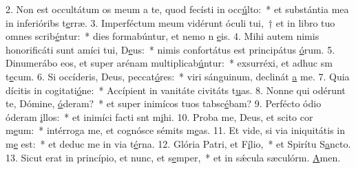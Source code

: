 2. Non est occultátum os meum a te, quod fecísti in occ\uline{ú}lto:~* et substántia mea in inferióribs t\uline{e}rræ.
3. Imperféctum meum vidérunt óculi tui,~† et in libro tuo omnes scrib\uline{é}ntur:~* dies formabúntur, et nemo n \uline{e}is.
4. Mihi autem nimis honorificáti sunt amíci tui, D\uline{e}us:~* nimis confortátus est principátus \uline{ó}rum.
5. Dinumerábo eos, et super arénam multiplicab\uline{ú}ntur:~* exsurréxi, et adhuc sm t\uline{e}cum.
6. Si occíderis, Deus, peccat\uline{ó}res:~* viri sánguinum, declinát \uline{a} me.
7. Quia dícitis in cogitati\uline{ó}ne:~* Accípient in vanitáte civitáts t\uline{u}as.
8. Nonne qui odérunt te, Dómine, \uline{ó}deram?~* et super inimícos tuos tabsc\uline{é}bam?
9. Perfécto ódio óderam \uline{i}llos:~* et inimíci facti snt m\uline{i}hi.
10. Proba me, Deus, et scito cor m\uline{e}um:~* intérroga me, et cognósce sémits m\uline{e}as.
11. Et vide, si via iniquitátis in m\uline{e} est:~* et deduc me in via t\uline{é}rna.
12. Glória Patri, et F\uline{í}lio,~* et Spirítu S\uline{a}ncto.
13. Sicut erat in princípio, et nunc, et s\uline{e}mper,~* et in sǽcula sæculórm. \uline{A}men.
